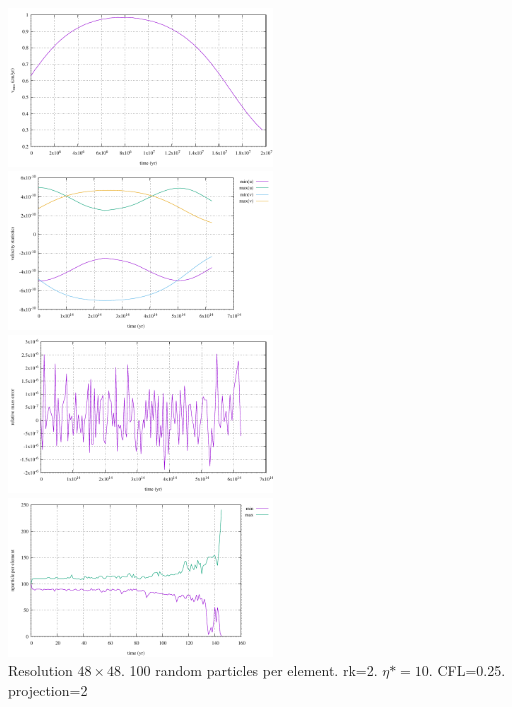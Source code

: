 \begin{center}
\includegraphics[width=7cm]{python_codes/fieldstone_67/sinking/vrms.pdf}
\includegraphics[width=7cm]{python_codes/fieldstone_67/sinking/vel.pdf}\\
\includegraphics[width=7cm]{python_codes/fieldstone_67/sinking/mass.pdf}
\includegraphics[width=7cm]{python_codes/fieldstone_67/sinking/nparticle_per_element.pdf}\\
{\captionfont Resolution $48\times48$. 100 random particles per element. rk=2. $\eta*=10$. CFL=0.25. 
projection=2}
\end{center}


